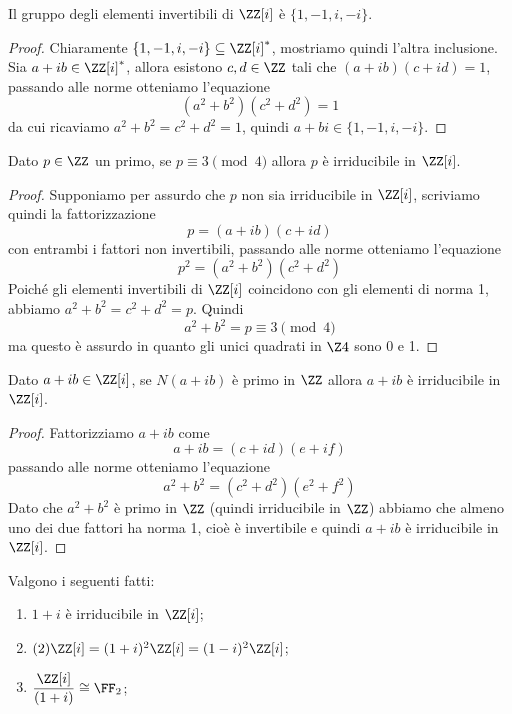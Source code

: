 \documentclass[11pt]{scrartcl}
\begin{document}
	\begin{lemma}
		Il gruppo degli elementi invertibili di $\ZZ[i]$ è $\{1, -1, i, -i\}$.
	\end{lemma}
	
	\begin{proof}
		Chiaramente $\{1, -1, i, -i\} \subseteq \ZZ[i]^*$, mostriamo quindi l'altra
		inclusione. Sia $a + ib \in \ZZ[i]^*$, allora esistono $c, d \in \ZZ$
		tali che $(a + ib)(c + id) = 1$, passando alle norme otteniamo l'equazione
		\[
		(a^2 + b^2)(c^2 + d^2) = 1
		\]
		da cui ricaviamo $a^2 + b^2 = c^2 + d^2 = 1$, quindi $a + bi \in \{1, -1, i, -i\}$.
	\end{proof}
	
	\begin{lemma}
		\label{lemma2.13}
		Dato $p \in \ZZ$ un primo, se $p \equiv 3 \pmod 4$ allora $p$ è irriducibile
		in $\ZZ[i]$.
	\end{lemma}
	
	\begin{proof}
		Supponiamo per assurdo che $p$ non sia irriducibile in $\ZZ[i]$, scriviamo quindi
		la fattorizzazione
		\[
		p = (a + ib)(c + id)
		\]
		con entrambi i fattori non invertibili, passando alle norme otteniamo 
		l'equazione
		\[
		p^2 = (a^2 + b^2)(c^2 + d^2)
		\]
		Poiché gli elementi invertibili di $\ZZ[i]$ coincidono con gli elementi di 
		norma 1, abbiamo $a^2 + b^2 = c^2 + d^2 = p$. Quindi 
		\[
		a^2 + b^2 = p \equiv 3 \pmod 4
		\]
		ma questo è assurdo in quanto gli unici quadrati in $\Z4$ sono 0 e 1.
	\end{proof}
	
	\begin{lemma}
		\label{lemma2.14}
		Dato $a + ib \in \ZZ[i]$, se $N(a + ib)$ è primo in $\ZZ$ allora $a + ib$
		è irriducibile in $\ZZ[i]$.
	\end{lemma}
	
	\begin{proof}
		Fattorizziamo $a + ib$ come 
		\[
		a + ib = (c + id)(e + if)
		\]
		passando alle norme otteniamo l'equazione
		\[
		a^2 + b^2 = (c^2 + d^2)(e^2 + f^2)
		\]
		Dato che $a^2 + b^2$ è primo in $\ZZ$ (quindi irriducibile in $\ZZ$)
		abbiamo che almeno uno dei due fattori ha norma 1, cioè è invertibile e 
		quindi $a + ib$ è irriducibile in $\ZZ[i]$.
	\end{proof}
	
	\begin{lemma}
		\label{lemma2.15}
		Valgono i seguenti fatti:
		\begin{enumerate}[(1)]
			\item $1 + i$ è irriducibile in $\ZZ[i]$;
			\item $(2)\ZZ[i] = (1 + i)^2\ZZ[i] = (1 - i)^2\ZZ[i]$;
			\item $\displaystyle\frac{\ZZ[i]}{(1 + i)}\cong \FF_2$;
		\end{enumerate}
	\end{lemma}
	
\end{document}
